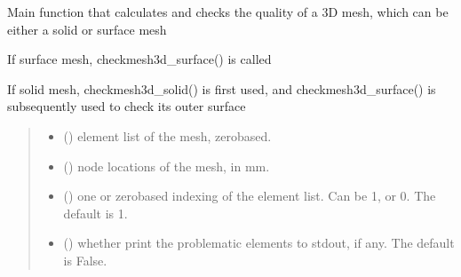 \documentclass[letterpaper,10pt,english]{sphinxmanual}
\begin{document}
\begin{fulllineitems}
\label{\detokenize{_autosummary/nirfasterff.meshing.meshutils.CheckMesh3D:nirfasterff.meshing.meshutils.CheckMesh3D}}
\pysigstartsignatures
{}
\pysigstopsignatures
\sphinxAtStartPar
Main function that calculates and checks the quality of a 3D mesh, which can be either a solid or surface mesh

\sphinxAtStartPar
If surface mesh, checkmesh3d\_surface() is called

\sphinxAtStartPar
If solid mesh, checkmesh3d\_solid() is first used, and checkmesh3d\_surface() is subsequently used to check its outer surface
\begin{quote}\begin{description}
\begin{itemize}
\item {} 
\sphinxAtStartPar
{} () \textendash{} element list of the mesh, zero\sphinxhyphen{}based.

\item {} 
\sphinxAtStartPar
{} () \textendash{} node locations of the mesh, in mm.

\item {} 
\sphinxAtStartPar
{} (\sphinxstyleliteralemphasis{\sphinxupquote{, }}) \textendash{} one\sphinxhyphen{} or zero\sphinxhyphen{}based indexing of the element list. Can be 1, or 0. The default is 1.

\item {} 
\sphinxAtStartPar
{} (\sphinxstyleliteralemphasis{\sphinxupquote{, }}) \textendash{} whether print the problematic elements to stdout, if any. The default is False.


\end{itemize}
\end{description}
\end{quote}
\end{fulllineitems}
\end{document}
